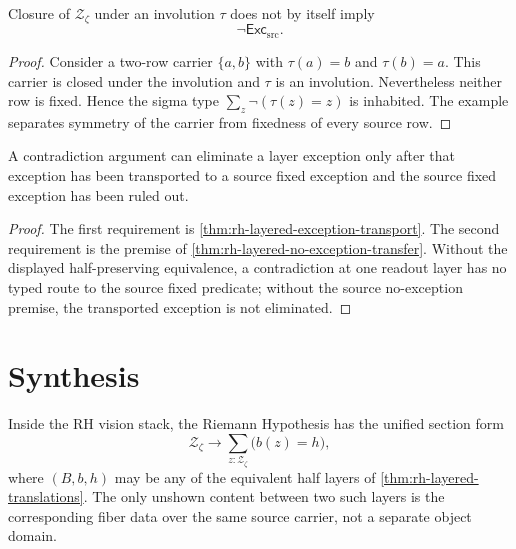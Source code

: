 \begin{theorem}
\label{thm:rh-layered-symmetry-not-no-exception}
Closure of $\mathcal Z_{\zeta}$ under an involution $\tau$ does not by
itself imply
$$
\neg\mathsf{Exc}_{\mathrm{src}}.
$$
\end{theorem}

\begin{proof}
Consider a two-row carrier $\{a,b\}$ with $\tau(a)=b$ and $\tau(b)=a$.
This carrier is closed under the involution and $\tau$ is an involution.
Nevertheless neither row is fixed. Hence the sigma type
$\sum_z\neg(\tau(z)=z)$ is inhabited. The example separates symmetry of
the carrier from fixedness of every source row.
\end{proof}

\begin{corollary}
\label{cor:rh-layered-contradiction-role}
A contradiction argument can eliminate a layer exception only after that
exception has been transported to a source fixed exception and the
source fixed exception has been ruled out.
\end{corollary}

\begin{proof}
The first requirement is \autoref{thm:rh-layered-exception-transport}.
The second requirement is the premise of
\autoref{thm:rh-layered-no-exception-transfer}. Without the displayed
half-preserving equivalence, a contradiction at one readout layer has no
typed route to the source fixed predicate; without the source
no-exception premise, the transported exception is not eliminated.
\end{proof}

\section{Synthesis}
\label{sec:rh-layered-translation-synthesis}

\begin{theorem}
\label{thm:rh-layered-translation-synthesis}
Inside the RH vision stack, the Riemann Hypothesis has the unified
section form
$$
\mathcal Z_{\zeta}
\to
\sum_{z:\mathcal Z_{\zeta}}
\bigl(b(z)=h\bigr),
$$
where $(B,b,h)$ may be any of the equivalent half layers of
\autoref{thm:rh-layered-translations}. The only unshown content between
two such layers is the corresponding fiber data over the same source
carrier, not a separate object domain.
\end{theorem}

